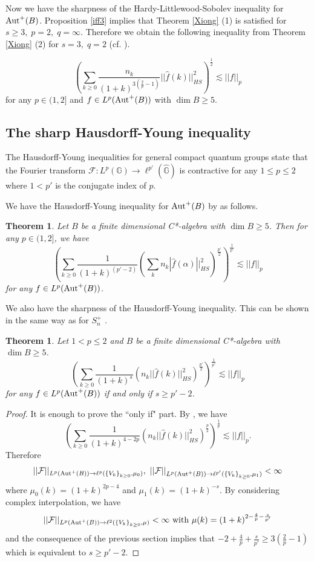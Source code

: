 \documentclass[12pt]{amsart}
\theoremstyle{plain} %
\newtheorem{theorem}[equation]{Theorem}
\theoremstyle{definition}
\theoremstyle{remark}
\begin{document}
Now we have the sharpness of the Hardy-Littlewood-Sobolev inequality for ${\rm Aut}^+(B)$.
Proposition \ref{iff3} implies that Theorem \ref{Xiong} (1) is satisfied for $s\geq3,\;p=2,\;q=\infty$.
Therefore we obtain the following inequality from Theorem \ref{Xiong} (2) for $s=3,\;q=2$  (cf. \cite[Example 4 (2)]{You20}).

 \[\left(\sum_{k\geq0}\frac{n_k}{(1+k)^{3(\frac{2}{p}-1)}}||\widehat{f}(k)||_{HS}^2\right)^{\frac{1}{2}}\lesssim||f||_p\]
 for any $p\in(1,2]$ and $f\in L^p({\rm Aut}^+(B))$ with $\dim B\geq5$.

\subsection{The sharp Hausdorff-Young inequality}
  The Hausdorff-Young inequalities for general compact quantum groups state that the Fourier transform $\mathcal{F}:L^p(\mathbb{G})\to\ell^{p'}(\widehat{\mathbb{G}})$ is contractive for any $1\leq p\leq2$ where $1<p'$ is the conjugate index of $p$. 

We have the Hausdorff-Young inequality for ${\rm Aut}^+(B)$ by \cite[Theorem 4.1]{You20} as follows.

\begin{theorem}
Let $B$ be a finite dimensional C*-algebra with $\dim B\geq5$.
Then for any $p\in (1, 2]$, we have
\[\left(\sum_{k\geq0}\frac{1}{(1+k)^{ (p'-2)}}\left(\sum_k n_k|\widehat{f}(\alpha)||^2_{HS}\right)^{\frac{p'}{2}}\right)^{\frac{1}{p'}}\lesssim||f||_p\]
for any $f\in L^p({\rm Aut}^+(B))$.
\end{theorem} 

We also have the sharpness of the Hausdorff-Young inequality. This can be shown in the same way as for $S_n^+$ \cite[Corollary 6.3]{You20}.

\begin{theorem}
 Let $1<p\leq2$ and $B$ be a finite dimensional C*-algebra with $\dim B\geq5$.
 \[\left(\sum_{k\geq0}\frac{1}{(1+k)^s}\left(n_k||\widehat{f}(k)||^2_{HS}\right)^{\frac{p'}{2}}\right)^{\frac{1}{p'}}\lesssim ||f||_p\]
 for any $f\in L^p({\rm Aut}^+(B))$ if and only if $s\geq p'-2$.
 \end{theorem}
 
 \begin{proof}
 It is enough to prove the ``only if" part.
 By \cite[Corollary 3.9]{You18}, we have
 \[\left(\sum_{k\geq0}\frac{1}{(1+k)^{4-2p}}\left(n_k ||\widehat{f}(k)||_{HS}^2\right)^{\frac{p}{2}}\right)^{\frac{1}{p}}\lesssim ||f||_p.\]
 Therefore 
 \[||\mathcal{F}||_{L^p({\rm Aut}^+(B))\rightarrow \ell^p(\left \{V_k\right\}_{k\geq 0},\mu_0)},~||\mathcal{F}||_{L^p({\rm Aut}^+(B))\rightarrow \ell^{p'}(\left \{V_k\right\}_{k\geq 0},\mu_1)}<\infty \] 
where $\mu_0(k)=(1+k)^{2p-4}$ and $\mu_1(k)=(1+k)^{-s}$. By considering complex interpolation, we have 
\[||\mathcal{F}||_{L^p({\rm Aut}^+(B))\rightarrow \ell^{2}(\left \{V_k\right\}_{k\geq 0},\mu)}<\infty~\mathrm{with}~\mu(k)=(1+k)^{2-\frac{4}{p}-\frac{s}{p'}}\] and the consequence of the previous section implies that $\displaystyle -2+\frac{4}{p}+\frac{s}{p'}\geq 3(\frac{2}{p}-1)$ which is equivalent to $s\geq p'-2$.
 \end{proof}
\end{document}
